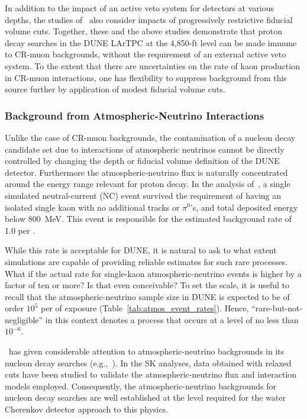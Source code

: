 In addition to the impact of an active veto system for detectors at 
various depths, the studies of~\cite{Bueno:2007um} also consider 
impacts of progressively restrictive fiducial volume cuts. 
Together, these and the above studies demonstrate that proton decay 
searches in the DUNE LArTPC at the 4,850-ft level can be made immune 
to CR-muon backgrounds, without the requirement of an external 
active veto system.  To the extent that there are uncertainties on 
the rate of kaon production in CR-muon interactions, one has flexibility 
to suppress background from this source further by application of modest 
fiducial volume cuts.


\subsubsection{Background from Atmospheric-Neutrino Interactions}

Unlike the case of CR-muon backgrounds, the contamination of 
a nucleon decay candidate set due to interactions of atmospheric 
neutrinos cannot be directly controlled by changing the depth 
or fiducial volume definition of the DUNE detector.  Furthermore 
the atmospheric-neutrino flux is naturally concentrated around 
the energy range relevant for proton decay.  In the analysis 
of~\cite{Bueno:2007um}, a single simulated neutral-current (NC) event 
survived the requirement of having an isolated single kaon 
with no additional tracks or $\pi^0$'s, and total deposited 
energy below \SI{800}{\MeV}.  This event is responsible 
for the estimated background rate of 1.0 per  \SI{}{\Mtyr}.

While this rate is acceptable for DUNE, it is natural to ask 
to what extent simulations are capable of providing reliable 
estimates for such rare processes.  What if the actual rate 
for single-kaon atmospheric-neutrino events is higher by a 
factor of ten or more?  Is that even conceivable?  To set the 
scale, it is useful to recall that the atmospheric-neutrino 
sample size in DUNE is expected to be of order $10^5$ per 
 \SI{}{\Mtyr} of exposure (Table~\ref{tab:atmos_event_rates}).  
Hence, ``rare-but-not-negligible'' in this context denotes
a process that occurs at a level of no less than $10^{-6}$.

\superk\ has given considerable attention to atmospheric-neutrino backgrounds in its nucleon decay searches (e.g.,~\cite{Kobayashi:2005pe}). 
In the SK analyses, data obtained with 
relaxed cuts have been studied to validate 
the atmospheric-neutrino flux and interaction models 
employed.  Consequently, the atmospheric-neutrino 
backgrounds for nucleon decay searches are well established 
at the level required for the water Cherenkov detector 
approach to this physics. 

